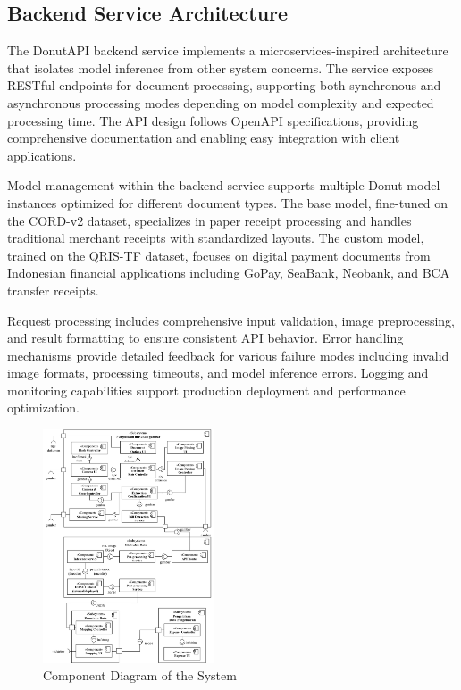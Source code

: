 \subsection{Backend Service Architecture}
The DonutAPI backend service implements a microservices-inspired architecture that isolates model inference from other system concerns. The service exposes RESTful endpoints for document processing, supporting both synchronous and asynchronous processing modes depending on model complexity and expected processing time. The API design follows OpenAPI specifications, providing comprehensive documentation and enabling easy integration with client applications.

Model management within the backend service supports multiple Donut model instances optimized for different document types. The base model, fine-tuned on the CORD-v2 dataset, specializes in paper receipt processing and handles traditional merchant receipts with standardized layouts. The custom model, trained on the QRIS-TF dataset, focuses on digital payment documents from Indonesian financial applications including GoPay, SeaBank, Neobank, and BCA transfer receipts.

Request processing includes comprehensive input validation, image preprocessing, and result formatting to ensure consistent API behavior. Error handling mechanisms provide detailed feedback for various failure modes including invalid image formats, processing timeouts, and model inference errors. Logging and monitoring capabilities support production deployment and performance optimization.

\begin{figure}[htbp]
    \centerline{\includegraphics[width=0.45\textwidth]{images/component-diagram.png}}
    \caption{Component Diagram of the System}
    \label{fig:component}
\end{figure}

